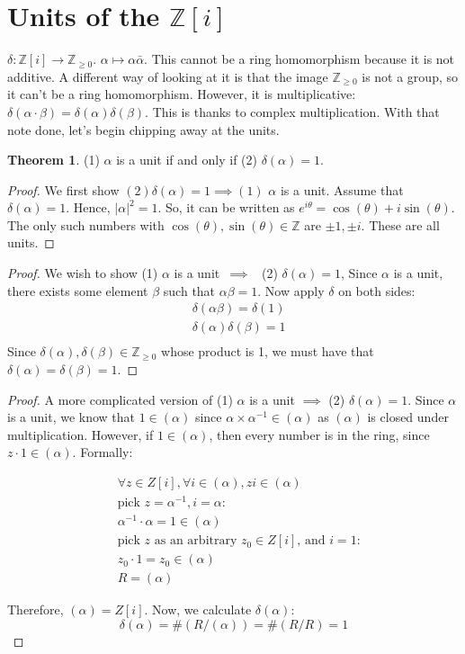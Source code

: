 \documentclass{book}
\newcommand{\Z}{\ensuremath{\mathbb{Z}}}
\theoremstyle{definition}
\newtheorem{theorem}{Theorem}
\begin{document}
\section{Units of the $\Z[i]$}
$\delta: \Z[i] \rightarrow \Z_{\geq 0}$. $\alpha \mapsto \alpha \bar \alpha$. This cannot
be a ring homomorphism because it is not additive. A different way of looking
at it is that the image $\Z_{\geq 0}$ is not a group, so it can't be
a ring homomorphism. However, it is multiplicative: $\delta(\alpha \cdot \beta) = \delta(\alpha) \delta(\beta)$.
This is thanks to complex multiplication. With that note done,
let's begin chipping away at the units.

\begin{theorem}
(1) $\alpha$ is a unit if and only if (2) $\delta(\alpha) = 1$.
\end{theorem}
\begin{proof}
We first show $(2) \delta(\alpha) = 1 \implies (1)$ $\alpha$ is a unit.
Assume that $\delta(\alpha) = 1$. Hence, $|\alpha|^2 = 1$.
So, it can be written as $e^{i \theta} = \cos(\theta) + i \sin(\theta)$. The only
such numbers with  $\cos(\theta), \sin(\theta) \in \Z$ are $\pm 1, \pm i$. 
These are all units. 
\end{proof}

\begin{proof}
We wish to show (1) $\alpha$ is a unit~$\implies$~ (2) $\delta (\alpha) = 1$, 
Since $\alpha$ is a unit, there exists some element $\beta$ such that $\alpha \beta = 1$.
Now apply $\delta$ on both sides:
\begin{align*}
&\delta(\alpha \beta) = \delta(1) \\
&\delta(\alpha) \delta(\beta) = 1 \\
\end{align*}
Since $\delta(\alpha), \delta(\beta) \in \Z_{\geq 0}$ whose product is 1, we must have that
$\delta(\alpha) = \delta(\beta) = 1$. 
\end{proof}


\begin{proof}
A more complicated version of (1) $\alpha$ is a unit $\implies$ (2) $\delta (\alpha) = 1$.
Since $\alpha$ is a unit, we know that $1 \in (\alpha)$ since $\alpha \times \alpha^{-1} \in (\alpha)$
as $(\alpha)$ is closed under multiplication. However, if $1 \in (\alpha)$,
then every number is in the ring, since $z \cdot 1 \in (\alpha)$. Formally:

\begin{align*}
&\forall z \in Z[i], \forall i \in (\alpha), zi \in (\alpha) \\
&\text{pick $z = \alpha^{-1}, i = \alpha$:} \\
&\alpha^{-1} \cdot \alpha = 1 \in (\alpha) \\
&\text{pick $z$ as an arbitrary $z_0 \in Z[i]$, and $i = 1$:} \\
&z_0 \cdot 1 =  z_0 \in (\alpha) \\
&R = (\alpha)
\end{align*}

Therefore, $(\alpha) = Z[i]$. Now, we calculate $\delta(\alpha)$:
$$\delta(\alpha) = \#(R/(\alpha)) = \#(R/R) = 1$$
\end{proof}
\end{document}
